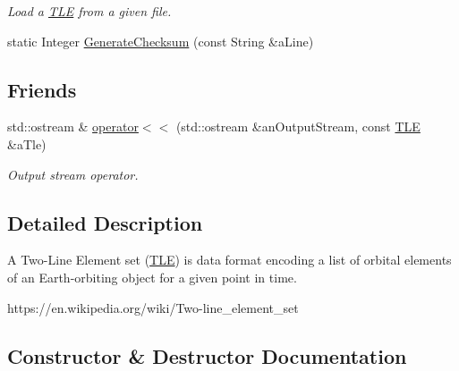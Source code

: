 \begin{DoxyCompactItemize}
\begin{DoxyCompactList}\small\item\em Load a \hyperlink{classostk_1_1astro_1_1trajectory_1_1orbit_1_1models_1_1sgp4_1_1_t_l_e}{T\+LE} from a given file. \end{DoxyCompactList}\item 
static Integer \hyperlink{classostk_1_1astro_1_1trajectory_1_1orbit_1_1models_1_1sgp4_1_1_t_l_e_a4f9d8d752fc3700fd9bac043f106e19b}{Generate\+Checksum} (const String \&a\+Line)
\end{DoxyCompactItemize}
\subsection*{Friends}
\begin{DoxyCompactItemize}
\item 
std\+::ostream \& \hyperlink{classostk_1_1astro_1_1trajectory_1_1orbit_1_1models_1_1sgp4_1_1_t_l_e_a54a7a3bca65674d5052031634f900984}{operator$<$$<$} (std\+::ostream \&an\+Output\+Stream, const \hyperlink{classostk_1_1astro_1_1trajectory_1_1orbit_1_1models_1_1sgp4_1_1_t_l_e}{T\+LE} \&a\+Tle)
\begin{DoxyCompactList}\small\item\em Output stream operator. \end{DoxyCompactList}\end{DoxyCompactItemize}


\subsection{Detailed Description}
A Two-\/\+Line Element set (\hyperlink{classostk_1_1astro_1_1trajectory_1_1orbit_1_1models_1_1sgp4_1_1_t_l_e}{T\+LE}) is data format encoding a list of orbital elements of an Earth-\/orbiting object for a given point in time. 

https\+://en.wikipedia.\+org/wiki/\+Two-\/line\+\_\+element\+\_\+set 

\subsection{Constructor \& Destructor Documentation}
\mbox{\label{classostk_1_1astro_1_1trajectory_1_1orbit_1_1models_1_1sgp4_1_1_t_l_e_a57323db2c24577c2e8ddce79fa776d1e}} 
